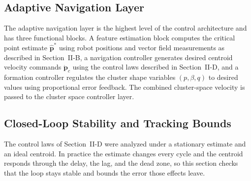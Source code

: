 \documentclass[lettersize,journal]{IEEEtran}
\begin{document}
\subsection{Adaptive Navigation Layer}

The adaptive navigation layer is the highest level of the control architecture and has three functional blocks. A feature estimation block computes the critical point estimate $\hat{\mathbf{p}}^*$ using robot positions and vector field measurements as described in Section~II-B, a navigation controller generates desired centroid velocity commands $\dot{\mathbf{p}}_c$ using the control laws described in Section~II-D, and a formation controller regulates the cluster shape variables $(p, \beta, q)$ to desired values using proportional error feedback. The combined cluster-space velocity is passed to the cluster space controller layer.

\subsection{Closed-Loop Stability and Tracking Bounds}
\label{sec:stability}

The control laws of Section~II-D were analyzed under a stationary estimate and an ideal centroid. In practice the estimate changes every cycle and the centroid responds through the delay, the lag, and the dead zone, so this section checks that the loop stays stable and bounds the error those effects leave.
\end{document}
